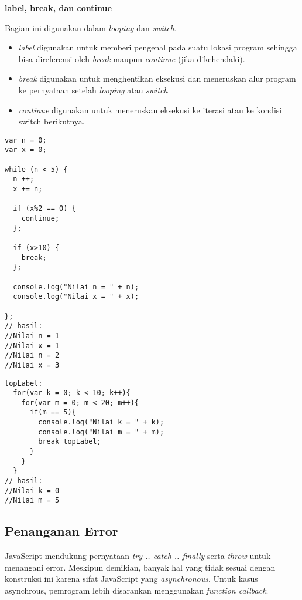 \textbf{label, break, dan continue}

Bagian ini digunakan dalam \textit{looping} dan \textit{switch}.
\begin{itemize}
  \item \textit{label} digunakan untuk memberi pengenal pada suatu lokasi program sehingga bisa direferensi oleh \textit{break} maupun \textit{continue} (jika dikehendaki). 
  \item \textit{break} digunakan untuk menghentikan eksekusi dan meneruskan alur program ke pernyataan setelah \textit{looping} atau \textit{switch}
  \item \textit{continue} digunakan untuk meneruskan eksekusi ke iterasi atau ke kondisi switch berikutnya.
\end{itemize}

\begin{lstlisting}
var n = 0;
var x = 0;

while (n < 5) {
  n ++;
  x += n;

  if (x%2 == 0) {
    continue;
  };

  if (x>10) {
    break;
  };

  console.log("Nilai n = " + n);
  console.log("Nilai x = " + x);

};
// hasil:
//Nilai n = 1
//Nilai x = 1
//Nilai n = 2
//Nilai x = 3
\end{lstlisting}

\begin{lstlisting}
topLabel:
  for(var k = 0; k < 10; k++){
    for(var m = 0; m < 20; m++){
      if(m == 5){
        console.log("Nilai k = " + k);
        console.log("Nilai m = " + m);
        break topLabel;
      }
    }
  }
// hasil: 
//Nilai k = 0
//Nilai m = 5
\end{lstlisting}

\subsection{Penanganan Error}

JavaScript mendukung pernyataan \textit{try .. catch .. finally} serta \textit{throw} untuk menangani error. Meskipun demikian, banyak hal yang tidak sesuai dengan konstruksi ini karena sifat JavaScript yang \textit{asynchronous}. Untuk kasus asynchrous, pemrogram lebih disarankan menggunakan \textit{function callback}.

